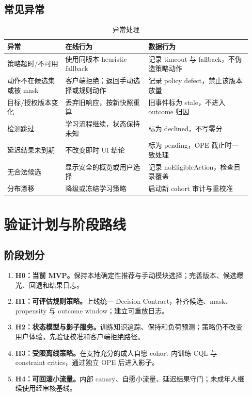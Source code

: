 \documentclass[11pt,a4paper,fontset=none]{ctexart}
\newcommand{\1}{\mathbb{I}}
\begin{document}
\subsection{常见异常}

\begin{table}[htbp]
  \centering
  \caption{异常处理}
  \label{tab:failure}
  \begin{tabularx}{\textwidth}{L{39mm}YY}
    \toprule
    异常 & 在线行为 & 数据行为 \\
    \midrule
    策略超时/不可用 & 使用同版本 heuristic fallback & 记录 timeout 与 fallback，不伪造策略动作 \\
    动作不在候选集或被 mask & 客户端拒绝；返回手动选择或规则动作 & 记录 policy defect，禁止该版本放量 \\
    目标/授权版本变化 & 丢弃旧响应，按新快照重算 & 旧事件标为 stale，不进入 outcome 归因 \\
    检测跳过 & 学习流程继续，状态保持未知 & 标为 declined，不写零分 \\
    延迟结果未到期 & 不改变即时 UI 结论 & 标为 pending，OPE 截止时一致处理 \\
    无合法候选 & 显示安全的概览或用户选择 & 记录 noEligibleAction，检查目录覆盖 \\
    分布漂移 & 降级或冻结学习策略 & 启动新 cohort 审计与重校准 \\
    \bottomrule
  \end{tabularx}
\end{table}

\section{验证计划与阶段路线}

\subsection{阶段划分}

\begin{enumerate}
  \item \textbf{H0：当前 MVP。}保持本地确定性推荐与手动模块选择；完善版本、候选曝光、回退和结果日志。
  \item \textbf{H1：可评估规则策略。}上线统一 Decision Contract，补齐候选、mask、propensity 与 outcome window；建立可重放日志。
  \item \textbf{H2：状态模型与影子服务。}训练知识追踪、保持和负荷预测；策略仍不改变用户体验，先验证校准和客户端拒绝路径。
  \item \textbf{H3：受限离线策略。}在支持充分的成人自愿 cohort 内训练 CQL 与 constraint critics，通过独立 OPE 后进入影子。
  \item \textbf{H4：可回滚小流量。}内部 canary、自愿小流量、延迟结果守门；未成年人继续使用经审核基线。
\end{enumerate}
\end{document}
